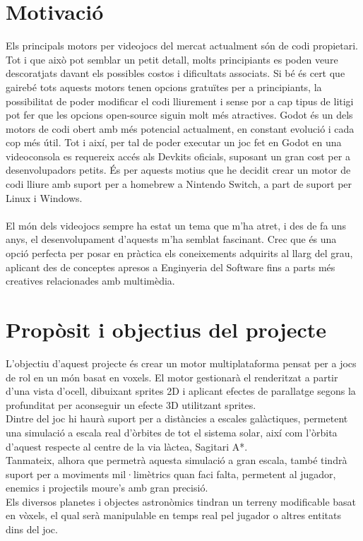 \section{Motivació}
Els principals motors per videojocs del mercat actualment són de codi propietari. Tot i que això pot semblar un petit detall, molts principiants es poden veure descoratjats davant els possibles costos i dificultats associats.
Si bé és cert que gairebé tots aquests motors tenen opcions gratuïtes per a principiants, la possibilitat de poder modificar el codi lliurement i sense por a cap tipus de litigi pot fer que les opcions open-source siguin molt més atractives.
Godot és un dels motors de codi obert amb més potencial actualment, en constant evolució i cada cop més útil. Tot i així, per tal de poder executar un joc fet en Godot en una videoconsola es requereix accés als Devkits oficials, suposant un gran cost per a desenvolupadors petits.
És per aquests motius que he decidit crear un motor de codi lliure amb suport per a homebrew a Nintendo Switch, a part de suport per Linux i Windows.
\paragraph{}
El món dels videojocs sempre ha estat un tema que m'ha atret, i des de fa uns anys, el desenvolupament d'aquests m'ha semblat fascinant.
Crec que és una opció perfecta per posar en pràctica els coneixements adquirits al llarg del grau, aplicant des de conceptes apresos a Enginyeria del Software fins a parts més creatives relacionades amb multimèdia.
\section{Propòsit i objectius del projecte}
L'objectiu d'aquest projecte és crear un motor multiplataforma pensat per a jocs de rol en un món basat en voxels.
El motor gestionarà el renderitzat a partir d'una vista d'ocell, dibuixant sprites 2D i aplicant efectes de parallatge segons la profunditat per aconseguir un efecte 3D utilitzant sprites.
\\
Dintre del joc hi haurà suport per a distàncies a escales galàctiques, permetent una simulació a escala real d'òrbites de tot el sistema solar, així com l'òrbita d'aquest respecte al centre de la via làctea, Sagitari A*.
\\
Tanmateix, alhora que permetrà aquesta simulació a gran escala, també tindrà suport per a moviments mil·limètrics quan faci falta, permetent al jugador, enemics i projectils moure's amb gran precisió.
\\
Els diversos planetes i objectes astronòmics tindran un terreny modificable basat en vòxels, el qual serà manipulable en temps real pel jugador o altres entitats dins del joc.
